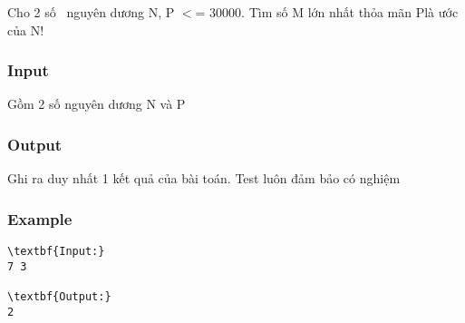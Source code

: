



   Cho 2 số  nguyên dương N, P $<$= 30000. Tìm số M lớn nhất thỏa mãn P\textasciicircumM là ước của N!  

\subsubsection{   Input  }

   Gồm 2 số nguyên dương N và P  

\subsubsection{   Output  }

   Ghi ra duy nhất 1 kết quả của bài toán. Test luôn đảm bảo có nghiệm  

\subsubsection{   Example  }
\begin{verbatim}
\textbf{Input:}
7 3

\textbf{Output:}
2\end{verbatim}